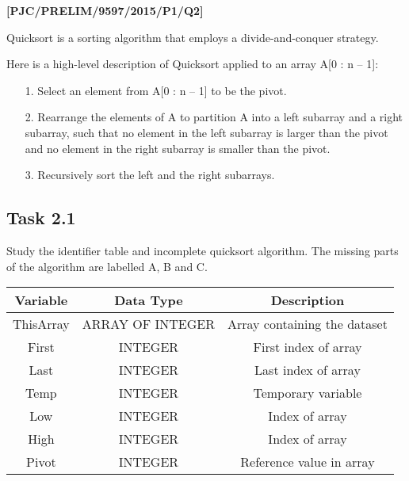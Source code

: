 \item \textbf{{[}PJC/PRELIM/9597/2015/P1/Q2{]} }

Quicksort is a sorting algorithm that employs a divide-and-conquer
strategy. 

Here is a high-level description of Quicksort applied to an array
A{[}0 : n -- 1{]}: 
\begin{enumerate}
\item[1.]  Select an element from A{[}0 : n -- 1{]} to be the pivot. 
\item[2.]  Rearrange the elements of A to partition A into a left subarray
and a right subarray, such that no element in the left subarray is
larger than the pivot and no element in the right subarray is smaller
than the pivot. 
\item[3.]  Recursively sort the left and the right subarrays.
\end{enumerate}

\subsection*{Task 2.1 }

Study the identifier table and incomplete quicksort algorithm. The
missing parts of the algorithm are labelled A, B and C. 
\noindent \begin{center}
\begin{tabular}{|c|c|c|}
\hline 
Variable & Data Type & Description\tabularnewline
\hline 
\hline 
ThisArray & ARRAY OF INTEGER & Array containing the dataset\tabularnewline
\hline 
First & INTEGER & First index of array\tabularnewline
\hline 
Last & INTEGER & Last index of array\tabularnewline
\hline 
Temp & INTEGER & Temporary variable\tabularnewline
\hline 
Low & INTEGER & Index of array\tabularnewline
\hline 
High & INTEGER & Index of array\tabularnewline
\hline 
Pivot & INTEGER & Reference value in array\tabularnewline
\hline 
\end{tabular}
\par\end{center}

